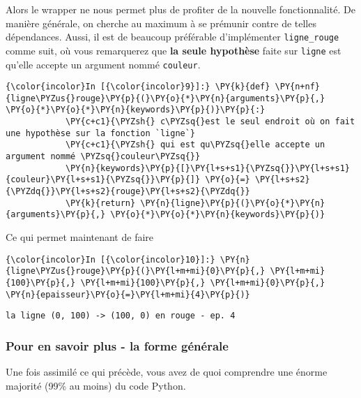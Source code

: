     Alors le wrapper ne nous permet plus de profiter de la nouvelle
fonctionnalité. De manière générale, on cherche au maximum à se prémunir
contre de telles dépendances. Aussi, il est de beaucoup préférable
d'implémenter \texttt{ligne\_rouge} comme suit, où vous remarquerez que
\textbf{la seule hypothèse} faite sur \texttt{ligne} est qu'elle accepte
un argument nommé \texttt{couleur}.

    \begin{Verbatim}[commandchars=\\\{\}]
{\color{incolor}In [{\color{incolor}9}]:} \PY{k}{def} \PY{n+nf}{ligne\PYZus{}rouge}\PY{p}{(}\PY{o}{*}\PY{n}{arguments}\PY{p}{,} \PY{o}{*}\PY{o}{*}\PY{n}{keywords}\PY{p}{)}\PY{p}{:}
            \PY{c+c1}{\PYZsh{} c\PYZsq{}est le seul endroit où on fait une hypothèse sur la fonction `ligne`}
            \PY{c+c1}{\PYZsh{} qui est qu\PYZsq{}elle accepte un argument nommé \PYZsq{}couleur\PYZsq{}}
            \PY{n}{keywords}\PY{p}{[}\PY{l+s+s1}{\PYZsq{}}\PY{l+s+s1}{couleur}\PY{l+s+s1}{\PYZsq{}}\PY{p}{]} \PY{o}{=} \PY{l+s+s2}{\PYZdq{}}\PY{l+s+s2}{rouge}\PY{l+s+s2}{\PYZdq{}}
            \PY{k}{return} \PY{n}{ligne}\PY{p}{(}\PY{o}{*}\PY{n}{arguments}\PY{p}{,} \PY{o}{*}\PY{o}{*}\PY{n}{keywords}\PY{p}{)}
\end{Verbatim}


    Ce qui permet maintenant de faire

    \begin{Verbatim}[commandchars=\\\{\}]
{\color{incolor}In [{\color{incolor}10}]:} \PY{n}{ligne\PYZus{}rouge}\PY{p}{(}\PY{l+m+mi}{0}\PY{p}{,} \PY{l+m+mi}{100}\PY{p}{,} \PY{l+m+mi}{100}\PY{p}{,} \PY{l+m+mi}{0}\PY{p}{,} \PY{n}{epaisseur}\PY{o}{=}\PY{l+m+mi}{4}\PY{p}{)}
\end{Verbatim}


    \begin{Verbatim}[commandchars=\\\{\}]
la ligne (0, 100) -> (100, 0) en rouge - ep. 4

    \end{Verbatim}

    \hypertarget{pour-en-savoir-plus---la-forme-guxe9nuxe9rale}{%
\subsubsection{Pour en savoir plus - la forme
générale}\label{pour-en-savoir-plus---la-forme-guxe9nuxe9rale}}

    Une fois assimilé ce qui précède, vous avez de quoi comprendre une
énorme majorité (99\% au moins) du code Python.

